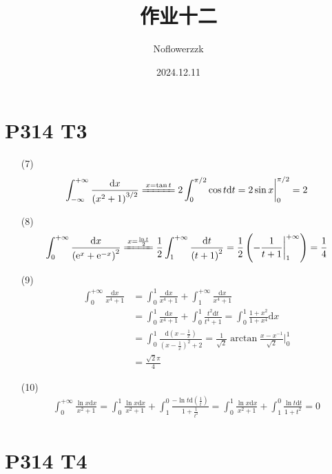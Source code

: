 \documentclass{article}
\title{作业十二}
\author{Noflowerzzk}
\date{2024.12.11}
\newcommand{\dd}{\mathrm{d}}
\newcommand{\dx}{\dd x}
\newcommand{\dt}{\dd t}
\newcommand{\ee}{\mathrm{e}}
\begin{document}
\maketitle

\section*{P314 T3}

\begin{itemize}
    \item [(7)] 
    \begin{align*}
        \int_{-\infty}^{+\infty} \frac{\dx}{\left(x^2 + 1\right)^{3/2}} \xlongequal{x = \tan t} 2\int_{0}^{\pi/2}\cos t \dt = 2\sin x \bigg|_0^{\pi/2} = 2
    \end{align*}
    \item [(8)]
    \begin{align*}
        \int_{0}^{+\infty}\frac{\dx}{\left(\ee^x + \ee^{-x}\right)^2} \xlongequal{x = \frac{\ln t}{2}} \frac{1}{2}\int_{1}^{+\infty}\frac{\dt}{\left(t + 1\right)^2} = \frac{1}{2}\left(-\frac{1}{t + 1}\bigg|_1^{+\infty}\right) = \frac{1}{4}
    \end{align*}
    \item [(9)]
    \begin{align*}
        \int_{0}^{+\infty}\frac{\dx}{x^4 + 1} &= \int_{0}^{1}\frac{\dx}{x^4 + 1} + \int_{1}^{+\infty}\frac{\dx}{x^4 + 1} \\
        &= \int_{0}^{1}\frac{\dx}{x^4 + 1} + \int_{0}^{1}\frac{t^2\dt}{t^4 + 1} = \int_{0}^{1}\frac{1 + x^2}{1 + x^4}\dx \\
        &= \int_{0}^{1}\frac{\dd\left(x - \frac{1}{x}\right)}{\left(x - \frac{1}{x}\right)^2 + 2} = \frac{1}{\sqrt{2}}\arctan \frac{x - x^{-1}}{\sqrt{2}}\bigg|_0^1 \\
        &= \frac{\sqrt{2}\pi}{4}
    \end{align*}
    \item [(10)] 
    \begin{align*}
        \int_{0}^{+\infty}\frac{\ln x \dx}{x^2 + 1} = \int_{0}^{1}\frac{\ln x \dx}{x^2 + 1} + \int_{1}^{0}\frac{-\ln t \dd\left(\frac{1}{t}\right)}{1 + \frac{1}{t^2}} = \int_{0}^{1}\frac{\ln x \dx}{x^2 + 1} + \int_{1}^{0}\frac{\ln t \dt}{1 + t^2} = 0
    \end{align*}
\end{itemize}

\section*{P314 T4}
\end{document}
